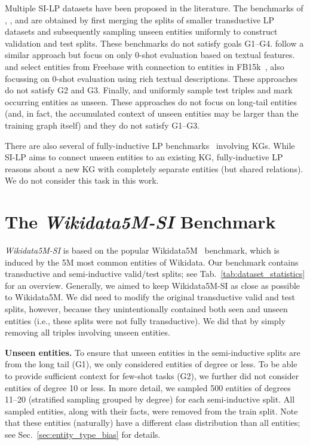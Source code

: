 \documentclass[11pt]{article}
\renewcommand\:{\colon} \newcommand{\sset}[1]{\left\{\,#1\,\right\}} \newcommand{\ssets}[1]{\left\{#1\right\}} \newcommand{\ssetn}[1]{\{\,#1\,\}}
\begin{document}
Multiple SI-LP datasets have been proposed in the literature. The benchmarks of
\citet{daza2021inductive}, \citet{albooyeh2020out}, and
\citet{galkin2021nodepiece} are obtained by first merging the splits of smaller
transductive LP datasets and subsequently sampling unseen entities uniformly to
construct validation and test splits. These benchmarks do not satisfy goals
G1--G4. \citet{shi2018open} follow a similar approach but focus on only
0-shot evaluation based on textual features. \citet{xie2016representation} and
\citet{shah2019open} select entities from Freebase with connection to entities
in FB15k~\cite{bordes2013translating}, also focussing on 0-shot evaluation using
rich textual descriptions. These approaches do not satisfy G2 and G3. Finally,
\citet{wang2019logic} and \citet{hamaguchi2017knowledge} uniformly sample test
triples and mark occurring entities as unseen. These approaches do not focus on
long-tail entities (and, in fact, the accumulated context of unseen entities may
be larger than the training graph itself) and they do not satisfy G1--G3.



There are also several of fully-inductive LP
benchmarks~\cite{teru2020inductive,wang2021KEPLER} involving KGs. While SI-LP
aims to connect unseen entities to an existing KG, fully-inductive LP reasons
about a new KG with completely separate entities (but shared relations). We do
not consider this task in this work.

\section{The \emph{Wikidata5M-SI} Benchmark}
\label{sec:dataset}



\emph{Wikidata5M-SI} is based on the popular Wikidata5M~\cite{wang2021KEPLER}
benchmark, which is induced by the 5M most common entities of Wikidata. Our
benchmark contains trans\-duc\-tive and semi-inductive valid/test splits; see
Tab.~\ref{tab:dataset_statistics} for an overview. Generally, we aimed to keep
Wikidata5M-SI as close as possible to Wikidata5M. We did need to modify the
original transductive valid and test splits, however, because they
unintentionally contained both seen and unseen entities (i.e., these splits were
not fully transductive). We did that by simply removing all triples involving
unseen entities.

\textbf{Unseen entities.} To ensure that unseen entities in the semi-inductive
splits are from the long tail (G1), we only considered entities of degree 
or less. To be able to provide sufficient context for few-shot tasks (G2), we
further did not consider entities of degree 10 or less. In more detail, we
sampled 500 entities of degrees 11--20 (stratified sampling grouped by degree)
for each semi-inductive split. All sampled entities, along with their facts, were
removed from the train split. Note that these entities (naturally) have a
different class distribution than all entities; see
Sec.~\ref{sec:entity_type_bias} for details.
\end{document}
